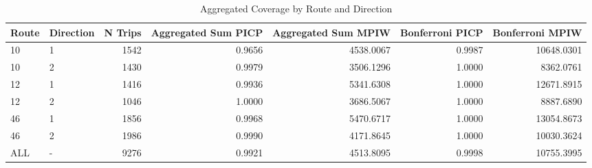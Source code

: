 \begin{table}
\caption{Aggregated Coverage by Route and Direction}
\label{tab:t63_aggregated_coverage}
\begin{tabular}{llrrrrr}
\toprule
Route & Direction & N Trips & Aggregated Sum PICP & Aggregated Sum MPIW & Bonferroni PICP & Bonferroni MPIW \\
\midrule
10 & 1 & 1542 & 0.9656 & 4538.0067 & 0.9987 & 10648.0301 \\
10 & 2 & 1430 & 0.9979 & 3506.1296 & 1.0000 & 8362.0761 \\
12 & 1 & 1416 & 0.9936 & 5341.6308 & 1.0000 & 12671.8915 \\
12 & 2 & 1046 & 1.0000 & 3686.5067 & 1.0000 & 8887.6890 \\
46 & 1 & 1856 & 0.9968 & 5470.6717 & 1.0000 & 13054.8673 \\
46 & 2 & 1986 & 0.9990 & 4171.8645 & 1.0000 & 10030.3624 \\
ALL & - & 9276 & 0.9921 & 4513.8095 & 0.9998 & 10755.3995 \\
\bottomrule
\end{tabular}
\end{table}
